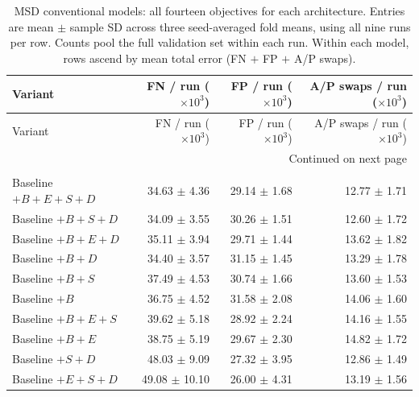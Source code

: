 \documentclass[12pt,a4paper]{article}
\begin{document}
\begingroup\footnotesize{}
\setlength{\tabcolsep}{4pt}
\renewcommand{\arraystretch}{1.12}
\begin{longtable}{@{}lrrr@{}}
\caption{MSD conventional models: all fourteen objectives for each architecture. Entries are mean $\pm$ sample SD across three seed-averaged fold means, using all nine runs per row. Counts pool the full validation set within each run. Within each model, rows ascend by mean total error (FN $+$ FP $+$ A/P swaps).}
\label{tab:msd-all-errors}\label{tab:capped-errors}\\
\hline
Variant & \shortstack{FN / run\\($\times 10^{3}$)} & \shortstack{FP / run\\($\times 10^{3}$)} & \shortstack{A/P swaps / run\\($\times 10^{3}$)} \\ \hline
\endfirsthead
\hline
Variant & \shortstack{FN / run\\($\times 10^{3}$)} & \shortstack{FP / run\\($\times 10^{3}$)} & \shortstack{A/P swaps / run\\($\times 10^{3}$)} \\ \hline
\endhead
\hline
\multicolumn{4}{r}{Continued on next page}\\
\endfoot
\hline\endlastfoot
\multicolumn{4}{@{}l}{\textbf{nnU-Net}}\\*
Baseline $+B+E+S+D$ & 34.63 $\pm$ 4.36 & 29.14 $\pm$ 1.68 & 12.77 $\pm$ 1.71 \\
Baseline $+B+S+D$ & 34.09 $\pm$ 3.55 & 30.26 $\pm$ 1.51 & 12.60 $\pm$ 1.72 \\
Baseline $+B+E+D$ & 35.11 $\pm$ 3.94 & 29.71 $\pm$ 1.44 & 13.62 $\pm$ 1.82 \\
Baseline $+B+D$ & 34.40 $\pm$ 3.57 & 31.15 $\pm$ 1.45 & 13.29 $\pm$ 1.78 \\
Baseline $+B+S$ & 37.49 $\pm$ 4.53 & 30.74 $\pm$ 1.66 & 13.60 $\pm$ 1.53 \\
Baseline $+B$ & 36.75 $\pm$ 4.52 & 31.58 $\pm$ 2.08 & 14.06 $\pm$ 1.60 \\
Baseline $+B+E+S$ & 39.62 $\pm$ 5.18 & 28.92 $\pm$ 2.24 & 14.16 $\pm$ 1.55 \\
Baseline $+B+E$ & 38.75 $\pm$ 5.19 & 29.67 $\pm$ 2.30 & 14.82 $\pm$ 1.72 \\
Baseline $+S+D$ & 48.03 $\pm$ 9.09 & 27.32 $\pm$ 3.95 & 12.86 $\pm$ 1.49 \\
Baseline $+E+S+D$ & 49.08 $\pm$ 10.10 & 26.00 $\pm$ 4.31 & 13.19 $\pm$ 1.56 \\

\end{longtable}
\end{document}
